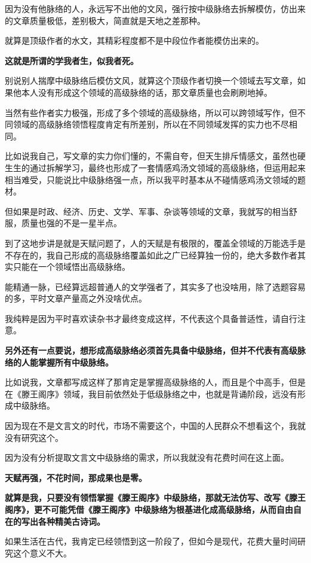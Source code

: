 \documentclass[UTF8, 11pt, oneside]{ctexart}
\newcommand{\zd}[1]{\textbf{\textcolor[RGB]{123,12,0}{#1}}} %
\begin{document}
因为没有他脉络的人，永远写不出他的文风，强行按中级脉络去拆解模仿，仿出来的文章质量极低，差别极大，简直就是天地之差那种。

就算是顶级作者的水文，其精彩程度都不是中段位作者能模仿出来的。

\zd{这就是所谓的学我者生，似我者死。}

别说别人揣摩中级脉络后模仿文风，就算这个顶级作者切换一个领域去写文章，如果他本人没有形成这个领域的高级脉络的话，那文章质量也会刷刷地掉。

当然有些作者实力极强，形成了多个领域的高级脉络，所以可以跨领域写作，但不同领域的高级脉络领悟程度肯定有所差别，所以在不同领域发挥的实力也不尽相同。

比如说我自己，写文章的实力你们懂的，不需自夸，但天生排斥情感文，虽然也硬生生的通过拆解学习，最终也形成了一套情感鸡汤文领域的高级脉络，但运用起来相当难受，只能说比中级脉络强一点，所以我平时基本从不碰情感鸡汤文领域的题材。

但如果是时政、经济、历史、文学、军事、杂谈等领域的文章，我就写的相当舒服，质量也强的不是一星半点。

到了这地步讲是就是天赋问题了，人的天赋是有极限的，覆盖全领域的万能选手是不存在的，我自己形成的高级脉络覆盖如此之广已经算独一份的，绝大多数作者其实只能在一个领域悟出高级脉络。

能精通一脉，已经算远超普通人的文学强者了，其实多了也没啥用，除了选题容易的多，平时文章产量高之外没啥优点。

我纯粹是因为平时喜欢读杂书才最终变成这样，不代表这个具备普适性，请自行注意。

\zd{另外还有一点要说，想形成高级脉络必须首先具备中级脉络，但并不代表有高级脉络的人能掌握所有中级脉络。}

比如说我，文章都写成这样了那肯定是掌握高级脉络的人，而且是个中高手，但是在《滕王阁序》领域，我目前依然处于低级脉络之中，也就是背诵阶段，远没有形成中级脉络。

因为现在不是文言文的时代，市场不需要这个，中国的人民群众不想看这个，我就没有研究这个。

因为没有分析提取文言文中级脉络的需求，所以我就没有花费时间在这上面。

\zd{天赋再强，不花时间，那成果也是零。}

\zd{就算是我，只要没有领悟掌握《滕王阁序》中级脉络，那就无法仿写、改写《滕王阁序》，更不可能凭借《滕王阁序》中级脉络为根基进化成高级脉络，从而自由自在的写出各种精美古诗词。}

如果生活在古代，我肯定已经领悟到这一阶段了，但如今是现代，花费大量时间研究这个意义不大。
\end{document}
